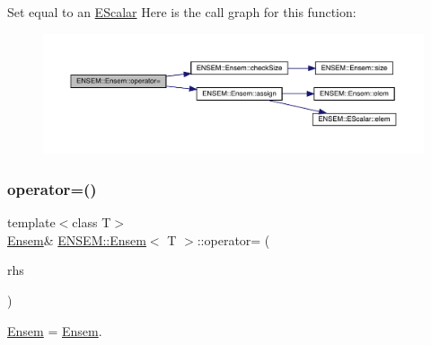 Set equal to an \mbox{\hyperlink{classENSEM_1_1EScalar}{E\+Scalar}} Here is the call graph for this function\+:
\nopagebreak
\begin{figure}[H]
\begin{center}
\leavevmode
\includegraphics[width=350pt]{d7/d3e/classENSEM_1_1Ensem_a376ab0239198595a09384c13d7a1ad1c_cgraph}
\end{center}
\end{figure}
\mbox{\label{classENSEM_1_1Ensem_a2f4f881dde88dfaf425051580e477e6c}} 
\subsubsection{\texorpdfstring{operator=()}{operator=()}\hspace{0.1cm}{\footnotesize\ttfamily [7/10]}}
{\footnotesize\ttfamily template$<$class T$>$ \\
\mbox{\hyperlink{classENSEM_1_1Ensem}{Ensem}}\& \mbox{\hyperlink{classENSEM_1_1Ensem}{E\+N\+S\+E\+M\+::\+Ensem}}$<$ T $>$\+::operator= (\begin{DoxyParamCaption}\item[{const \mbox{\hyperlink{classENSEM_1_1Ensem}{Ensem}}$<$ T $>$ \&}]{rhs }\end{DoxyParamCaption})\hspace{0.3cm}{\ttfamily [inline]}}



\mbox{\hyperlink{classENSEM_1_1Ensem}{Ensem}} = \mbox{\hyperlink{classENSEM_1_1Ensem}{Ensem}}. 


